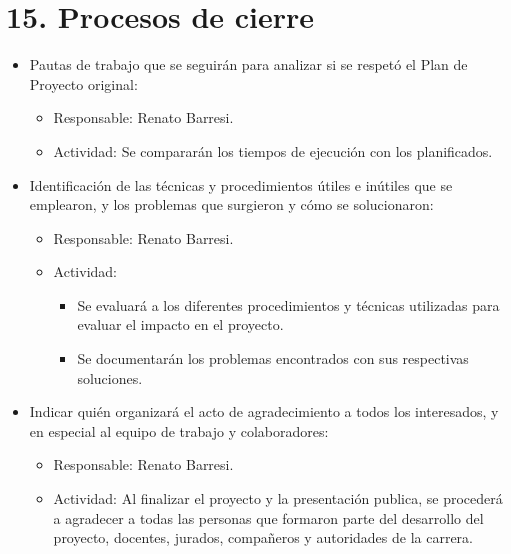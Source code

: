 \documentclass[
11pt, %
]{charter}
\begin{document}
\section{15. Procesos de cierre}    
\label{sec:cierre}


\begin{itemize}
	\item Pautas de trabajo que se seguirán para analizar si se respetó el Plan de Proyecto original:
		\begin{itemize}
	 		\item Responsable: Renato Barresi.
	 		\item Actividad: Se compararán los tiempos de ejecución con los planificados.\\
		\end{itemize}	  
	\item Identificación de las técnicas y procedimientos útiles e inútiles que se emplearon, y los problemas que surgieron y cómo se solucionaron:
		\begin{itemize}
	 		\item Responsable: Renato Barresi.
	 		\item Actividad:
	 			\begin{itemize}
	 				\item Se evaluará a los diferentes procedimientos y técnicas utilizadas para evaluar el impacto en el proyecto.
	 				\item Se documentarán los problemas encontrados con sus respectivas soluciones.
	 			\end{itemize}
		\end{itemize}	  
	\item Indicar quién organizará el acto de agradecimiento a todos los interesados, y en especial al equipo de trabajo y colaboradores:
		\begin{itemize}
	 		\item Responsable: Renato Barresi.
	 		\item Actividad: Al finalizar el proyecto y la presentación publica, se procederá a agradecer a todas las personas que formaron parte del desarrollo del proyecto, docentes, jurados, compañeros y autoridades de la carrera.\\
		\end{itemize}	  
\end{itemize}
\end{document}
